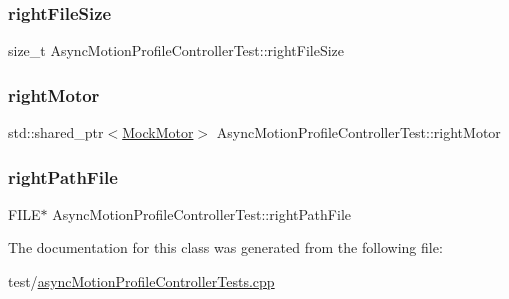 \subsubsection{\texorpdfstring{rightFileSize}{rightFileSize}}
{\footnotesize\ttfamily size\+\_\+t Async\+Motion\+Profile\+Controller\+Test\+::right\+File\+Size\hspace{0.3cm}{\ttfamily [protected]}}

\mbox{\label{classAsyncMotionProfileControllerTest_a22706fba8edf12704c22719dafde4702}} 
\subsubsection{\texorpdfstring{rightMotor}{rightMotor}}
{\footnotesize\ttfamily std\+::shared\+\_\+ptr$<$\mbox{\hyperlink{classokapi_1_1MockMotor}{Mock\+Motor}}$>$ Async\+Motion\+Profile\+Controller\+Test\+::right\+Motor\hspace{0.3cm}{\ttfamily [protected]}}

\mbox{\label{classAsyncMotionProfileControllerTest_a92b4d6e617bf1568008bf0a49a2dc27f}} 
\subsubsection{\texorpdfstring{rightPathFile}{rightPathFile}}
{\footnotesize\ttfamily F\+I\+LE$\ast$ Async\+Motion\+Profile\+Controller\+Test\+::right\+Path\+File\hspace{0.3cm}{\ttfamily [protected]}}



The documentation for this class was generated from the following file\+:\begin{DoxyCompactItemize}
\item 
test/\mbox{\hyperlink{asyncMotionProfileControllerTests_8cpp}{async\+Motion\+Profile\+Controller\+Tests.\+cpp}}\end{DoxyCompactItemize}
